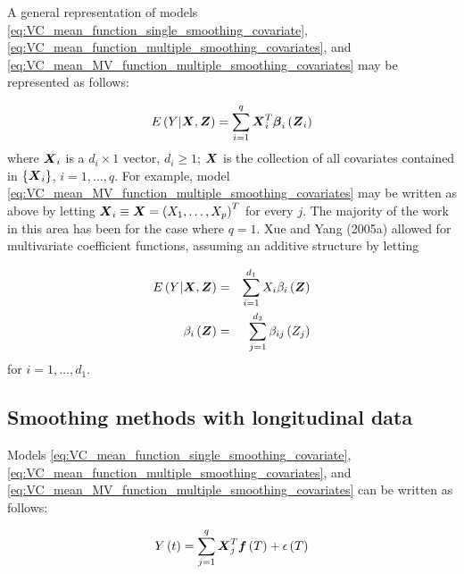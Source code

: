 \documentclass[12pt]{article}
\newcommand{\bfbeta}{\mbox{\boldmath $\beta$}}
\newcommand{\bff}{\mbox{\boldmath $f$}}
\newcommand{\bfX}{\mbox{\boldmath $X$}}
\newcommand{\bfZ}{\mbox{\boldmath $Z$}}
\begin{document}
A general representation of models \ref{eq:VC_mean_function_single_smoothing_covariate}, \ref{eq:VC_mean_function_multiple_smoothing_covariates}, and \ref{eq:VC_mean_MV_function_multiple_smoothing_covariates} may be represented as follows:

\begin{equation} \label{eq:general_VC_model}
E\left(Y \vert \bfX, \bfZ\right) = \sum_{i=1}^q \bfX_i^T \bfbeta_i\left(\bfZ_i\right)
\end{equation}
\noindent
where $\bfX_i$ is a $d_i \times 1$ vector, $d_i \ge 1$; $\bfX$ is the collection of all covariates contained in $\left\{ \bfX_i \right\}$, $i=1,\dots,q$. For example, model \ref{eq:VC_mean_MV_function_multiple_smoothing_covariates} may be written as above by letting $\bfX_i \equiv \bfX = \left(X_1,\dots, X_p\right)^T$ for every $j$. The majority of the work in this area has been for the case where $q=1$.  Xue and Yang (2005a) allowed for multivariate coefficient functions, assuming an additive structure by letting

\begin{eqnarray} 
E\left(Y \vert \bfX, \bfZ\right) &=& \sum_{i=1}^{d_1} X_i \beta_i\left(\bfZ\right) \label{eq:xue_VC_model}\\
\beta_i\left(\bfZ\right) &=& \sum_{j=1}^{d_2} \beta_{ij}\left(Z_j\right) \nonumber
\end{eqnarray}
\noindent
for $i=1,\dots, d_1$.

 

















\subsection{Smoothing methods with longitudinal data}

Models \ref{eq:VC_mean_function_single_smoothing_covariate}, \ref{eq:VC_mean_function_multiple_smoothing_covariates}, and \ref{eq:VC_mean_MV_function_multiple_smoothing_covariates} can be written as follows:

\begin{equation} \label{eq:functional_VC_model}
Y\left(t\right) = \sum_{j=1}^q \bfX_j^T \bff \left(T\right) + \epsilon\left(T\right)
\end{equation}
\end{document}

